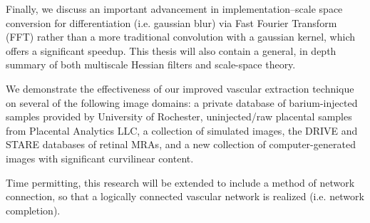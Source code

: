 Finally, we discuss an important advancement in implementation--scale space conversion for differentiation (i.e. gaussian blur) via Fast Fourier Transform (FFT) rather than a more traditional convolution with a gaussian kernel, which offers a significant speedup.  This thesis will also contain a general, in depth summary of both multiscale Hessian filters and scale-space theory. 

We demonstrate the effectiveness of our improved vascular extraction technique on several of the following image domains: a private database of barium-injected samples provided by University of Rochester, uninjected/raw placental samples from Placental Analytics LLC, a collection of simulated images, the DRIVE and STARE databases of retinal MRAs, and a new collection of computer-generated images with significant curvilinear content.

Time permitting, this research will be extended to include a method of network connection, so that a logically connected vascular network is realized (i.e. network completion).
